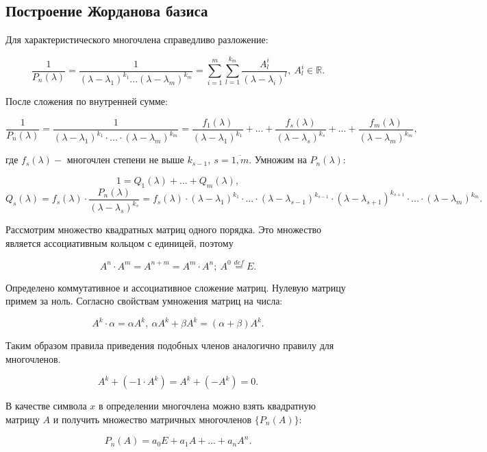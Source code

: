 \subsection{Построение Жорданова базиса}

Для характеристического многочлена справедливо разложение:

\[\frac{1}{P_n(\lambda)} = \frac{1}{(\lambda - \lambda_1)^{k_1}...(\lambda - \lambda_m)^{k_m}} = \sum\limits_{i = 1}^{m}{\sum\limits_{l=1}^{k_m}{\frac{A^i_l}{(\lambda - \lambda_i)^l}}},~ A^i_l \in \mathbb {R}.\]

После сложения по внутренней сумме:

\[\frac{1}{P_n(\lambda)} = \frac{1}{(\lambda - \lambda_1)^{k_1} \cdot ...\cdot (\lambda - \lambda_m)^{k_m}} = \frac{f_1(\lambda)}{(\lambda-\lambda_1)^{k_1}} + ... + \frac{f_s(\lambda)}{(\lambda-\lambda_s)^{k_s}} + ... + \frac{f_m(\lambda)}{(\lambda-\lambda_m)^{k_m}},\]

где $f_s(\lambda) - $ многочлен степени не выше $k_{s-1},~ s = \overline{1, m}$. Умножим на $P_n(\lambda):$

\[1 = Q_1(\lambda) + ... + Q_m(\lambda),\]
\begin{equation}
	Q_s(\lambda) = f_s(\lambda)\cdot\frac{P_n(\lambda)}{(\lambda - \lambda_s)^{k_s}} = f_s(\lambda)\cdot(\lambda - \lambda_1)^{k_1} \cdot ... \cdot (\lambda - \lambda_{s-1})^{k_{s-1}} \cdot (\lambda - \lambda_{s+1})^{k_{s+1}} \cdot ... \cdot (\lambda - \lambda_{m})^{k_{m}}.
	\label{20_1}
\end{equation}


Рассмотрим множество квадратных матриц одного порядка. Это множество является ассоциативным кольцом с единицей, поэтому

\[A^n \cdot A^m = A^{n+m} = A^m \cdot A^n;~ A^0 \stackrel{def}{=} E.\]

Определено коммутативное и ассоциативное сложение матриц. Нулевую матрицу примем за ноль. Согласно свойствам умножения матриц на числа:

\[A^k \cdot \alpha = \alpha A^k,~ \alpha A^k + \beta A^k = (\alpha + \beta) A^k.\]

Таким образом правила приведения подобных членов аналогично правилу для многочленов.

\[A^k + (-1 \cdot A^k) = A^k + (-A^k) = 0.\]

В качестве символа $x$ в определении многочлена можно взять квадратную матрицу $A$ и получить множество матричных многочленов $\{P_n(A)\}:$

\[P_n(A) = a_0 E + a_1 A + ... + a_n A^n.\]

